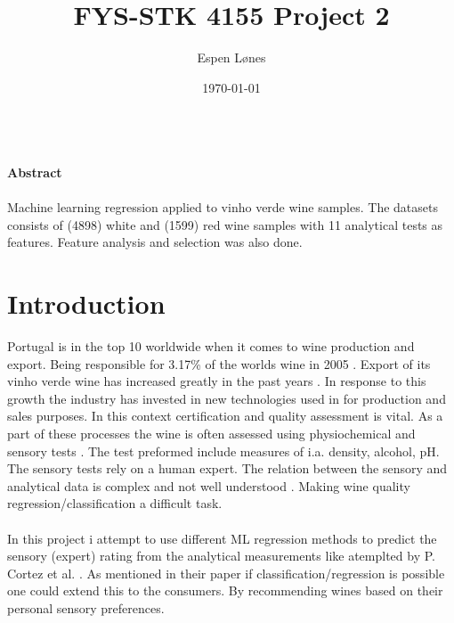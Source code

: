 \documentclass[12pt, letterpaper, twoside]{article}
\begin{document}
\title{FYS-STK 4155 Project 2}
\author{Espen Lønes}
\date{\today}
\maketitle
\ \\
\textbf{Abstract}\\
\ \\
Machine learning regression applied to vinho verde wine samples. The datasets consists of (4898) white and (1599) red wine samples with 11 analytical tests as features. Feature analysis and selection was also done.
\section{Introduction}
Portugal is in the top 10 worldwide when it comes to wine production and export. Being responsible for    3.17\% of the worlds wine in 2005 \cite{FAO}. Export of its vinho verde wine has increased greatly in the past years \cite{CVRVV}. In response to this growth the industry has invested in new technologies used in for production and sales purposes. In this context certification and quality assessment is vital. As a part of these processes the wine is often assessed using physiochemical and sensory tests \cite{Ebeler}. The test preformed include measures of i.a. density, alcohol, pH. The sensory tests rely on a human expert. The relation between the sensory and analytical data is complex and not well understood \cite{PvS}. Making wine quality regression/classification a difficult task.\\
\ \\
In this project i attempt to use different ML regression methods to predict the sensory (expert) rating from the analytical measurements like atemplted by P. Cortez et al. \cite{Citation paper}. As mentioned in their paper if classification/regression is possible one could extend this to the consumers. By recommending wines based on their personal sensory preferences.\\
\ \\
\end{document}
